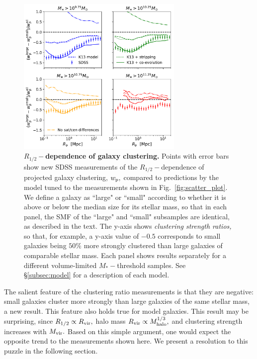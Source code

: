 \documentclass[usenatbib,usegraphicx,letterpaper]{mn2e}
\newcommand{\rhalf}{R_{1/2}}
\newcommand{\mstar}{M_{\ast}}
\newcommand{\mvir}{M_{\rm vir}}
\newcommand{\mhalo}{M_{\rm halo}}
\newcommand{\rvir}{R_{\rm vir}}
\newcommand{\wproj}{w_{\rm p}}
\begin{document}
\begin{figure}
\centering
\includegraphics[width=8cm]{FIGS/size_clustering_ratios_stripping_coevolution.pdf}
\caption{
{\bf $\rhalf-$dependence of galaxy clustering.}
Points with error bars show new SDSS measurements of the $\rhalf-$dependence of projected galaxy clustering, $\wproj,$ compared to predictions by the model tuned to the measurements shown in Fig.~\ref{fig:scatter_plot}. We define a galaxy as ``large" or ``small" according to whether it is above or below the median size for its stellar mass, so that in each panel, the SMF of the ``large" and ``small" subsamples are identical, as described in the text. The y-axis shows {\em clustering strength ratios,} so that, for example, a y-axis value of $-0.5$ corresponds to small galaxies being $50\%$ more strongly clustered than large galaxies of comparable stellar mass. Each panel shows results separately for a different volume-limited $\mstar-$threshold samples. See \S\ref{subsec:model} for a description of each model.}
\label{fig:clustering_ratio_upshot}
\end{figure}

The salient feature of the clustering ratio measurements is that they are negative: small galaxies cluster more strongly than large galaxies of the same stellar mass, a new result. This feature also holds true for model galaxies. This result may be surprising, since $\rhalf\propto\rvir,$ halo mass $\rvir\propto\mhalo^{1/3},$ and clustering strength increases with $\mvir.$ Based on this simple argument, one would expect the opposite trend to the measurements shown here. We present a resolution to this puzzle in the following section. 
\end{document}
